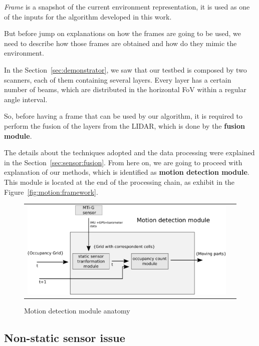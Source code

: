 \textit{Frame} is a snapshot of the current environment representation, it is used as one of the inputs for the algorithm developed in this work.

But before jump on explanations on how the frames are going to be used, we need to describe how those frames are obtained and how do they mimic the environment.

In the Section~\ref{sec:demonstrator}, we saw that our testbed is composed by two scanners, each of them containing several layers. Every layer has a certain number of beams, which are distributed in the horizontal FoV within a regular angle interval. 

So, before having a frame that can be used by our algorithm, it is required to perform the fusion of the layers from the LIDAR, which is done by the \textbf{fusion module}. 

The details about the techniques adopted and the data processing were explained in the Section~\ref{sec:sensor:fusion}. From here on, we are going to proceed with explanation of our methods, which is identified as \textbf{motion detection module}. This module is located at the end of the processing chain, as exhibit in the Figure~\ref{fig:motion:framework}. 

\begin{figure}[h]
   \centering
     \begin{tabular}{lr}
       \includegraphics[scale=0.50]{img/fig:motion:framework:motionmodule}
     \end{tabular}
   \caption{Motion detection module anatomy}
   \label{fig:motion:framework:motionmodule}
\end{figure}


\subsection{Non-static sensor issue}


